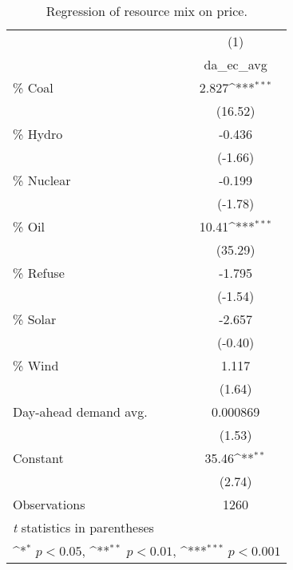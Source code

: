 \begin{table}[htbp]\centering
\def\sym#1{\ifmmode^{#1}\else\(^{#1}\)\fi}
\caption{Regression of resource mix on price.\label{tab1}}
\begin{tabular}{l*{1}{c}}
\hline\hline
                    &\multicolumn{1}{c}{(1)}\\
                    &\multicolumn{1}{c}{da\_ec\_avg}\\
\hline
\% Coal              &       2.827\sym{***}\\
                    &     (16.52)         \\
[1em]
\% Hydro             &      -0.436         \\
                    &     (-1.66)         \\
[1em]
\% Nuclear           &      -0.199         \\
                    &     (-1.78)         \\
[1em]
\% Oil               &       10.41\sym{***}\\
                    &     (35.29)         \\
[1em]
\% Refuse            &      -1.795         \\
                    &     (-1.54)         \\
[1em]
\% Solar             &      -2.657         \\
                    &     (-0.40)         \\
[1em]
\% Wind              &       1.117         \\
                    &      (1.64)         \\
[1em]
Day-ahead demand avg.         &    0.000869         \\
                    &      (1.53)         \\
[1em]
Constant            &       35.46\sym{**} \\
                    &      (2.74)         \\
\hline
Observations        &        1260         \\
\hline\hline
\multicolumn{2}{l}{\footnotesize \textit{t} statistics in parentheses}\\
\multicolumn{2}{l}{\footnotesize \sym{*} \(p<0.05\), \sym{**} \(p<0.01\), \sym{***} \(p<0.001\)}\\
\end{tabular}
\end{table}
